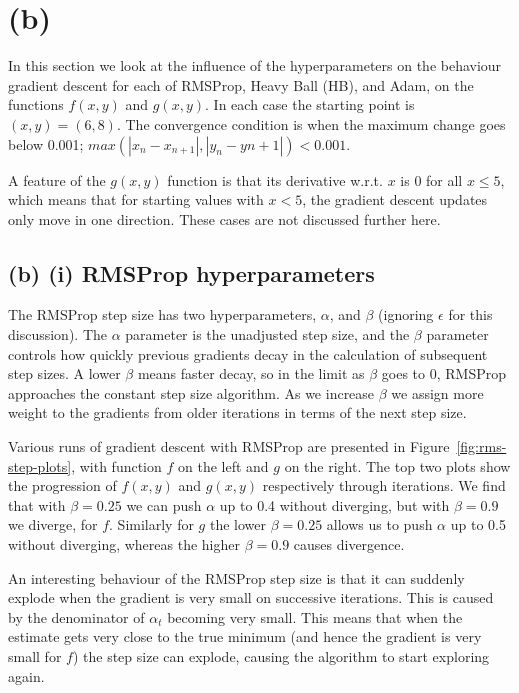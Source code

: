 \section{(b)}
In this section we look at the influence of the hyperparameters on
the behaviour gradient descent for each of RMSProp, Heavy Ball (HB), and Adam, on the functions
$f(x,y)$ and $g(x,y)$.
In each case the starting point is $(x,y)=(6,8)$.
The convergence condition is when the maximum change goes
below 0.001; $max(|x_n-x_{n+1}|,|y_n-y{n+1}|)<0.001$.

A feature of the $g(x,y)$ function is that its derivative w.r.t. $x$ is $0$ for
all $x\le5$, which means that for starting values with $x<5$, the gradient descent updates
only move in one direction. These cases are not discussed further here.

\subsection{(b) (i) RMSProp hyperparameters}
The RMSProp step size has two hyperparameters, $\alpha$, and $\beta$ (ignoring $\epsilon$ for this discussion).
The $\alpha$ parameter is the unadjusted step size, and the $\beta$ parameter controls
how quickly previous gradients decay in the calculation of subsequent step sizes.
A lower $\beta$ means faster decay, so in the limit as $\beta$ goes to $0$,
RMSProp approaches the constant step size algorithm.
As we increase $\beta$ we assign more weight to the gradients from older iterations
in terms of the next step size.

Various runs of gradient descent with RMSProp are presented
in Figure~\ref{fig:rms-step-plots}, with function $f$ on the
left and $g$ on the right. The top two plots show the
progression of $f(x,y)$ and $g(x,y)$ respectively through
iterations. We find that with $\beta=0.25$ we can push
$\alpha$ up to 0.4 without diverging, but with $\beta=0.9$
we diverge, for $f$. Similarly for $g$ the lower $\beta=0.25$
allows us to push $\alpha$ up to 0.5 without diverging, whereas
the higher $\beta=0.9$ causes divergence.

An interesting behaviour of the RMSProp step size is that
it can suddenly explode when the gradient is very
small on successive iterations.
This is caused by the denominator of $\alpha_t$
becoming very small.
This means that when the estimate gets very close to
the true minimum (and hence the gradient is very small for $f$)
the step size can explode, causing the algorithm to
start exploring again.

